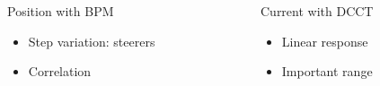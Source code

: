 \begin{frame}
\begin{columns}[T]
    \begin{column}{0.45\textwidth}
      \begin{block}{Position with BPM}
        \begin{itemize}
          \item Step variation: steerers
          \item Correlation
        \end{itemize}
      \end{block}
    \end{column}
    \begin{column}{0.45\textwidth}
      \begin{block}{Current with DCCT}
        \begin{itemize}
          \item Linear response
          \item Important range
        \end{itemize}
      \end{block}
    \end{column}
  \end{columns}
\end{frame}


